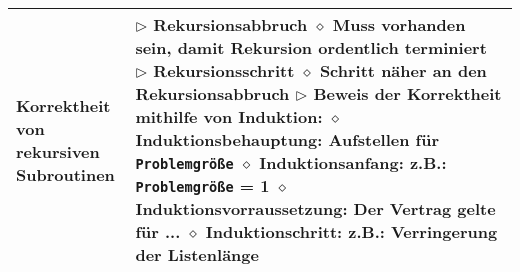 \begin{longtable}{ | p{} p{} | }
	\makecell[l]{Korrektheit von \\ rekursiven Subroutinen} & \makecell[l]{
	$\rhd$ Rekursionsabbruch \\
	\hspace{0.4cm} $\diamond$ Muss vorhanden sein, damit Rekursion ordentlich terminiert \\
	$\rhd$ Rekursionsschritt \\
	\hspace{0.4cm} $\diamond$ Schritt näher an den Rekursionsabbruch \\
	$\rhd$ Beweis der Korrektheit mithilfe von Induktion: \\
	\hspace{0.4cm} $\diamond$ Induktionsbehauptung: Aufstellen für \texttt{Problemgrö\ss e} \\
	\hspace{0.4cm} $\diamond$ Induktionsanfang: z.B.: \texttt{Problemgrö\ss e} = 1 \\
	\hspace{0.4cm} $\diamond$ Induktionsvorraussetzung: Der Vertrag gelte für ... \\
	\hspace{0.4cm} $\diamond$ Induktionschritt: z.B.: Verringerung der Listenlänge } \\ \hline


\end{longtable}
